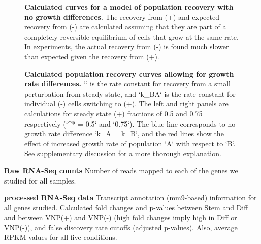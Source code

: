 \documentclass[aps,prl,twocolumn,superscriptaddress]{revtex4}
\begin{document}
\begin{figure}[H]
\begin{center}

\caption{\label{FIG:RecoveryCurveCalc} \textbf{Calculated curves for a model of population recovery with no growth differences}. The recovery from (+) and expected recovery from (-) are calculated assuming that they are part of a completely reversible equilibrium of cells that grow at the same rate. In experiments, the actual recovery from (-) is found much slower than expected given the recovery from (+).
}
\end{center}
\end{figure}


\begin{figure}[H]
\begin{center}

\caption{\label{FIG:GeneralCurves} \textbf{Calculated population recovery curves allowing for growth rate differences.} `\kappa` is the rate constant for recovery from a small perturbation from steady state, and `k_{BA}` is the rate constant for individual (-) cells switching to (+). The left and right panels are calculations for steady state (+) fractions of 0.5 and 0.75 respectively (`\alpha^* = 0.5` and `0.75`). The blue line corresponds to no growth rate difference `k_A = k_B`, and the red lines show the effect of increased growth rate of population `A` with respect to `B`. See supplementary discussion for a more thorough explanation. 
}
\end{center}
\end{figure}



\renewcommand{\thetable}{S\arabic{table}}

\begin{table}[H]
\begin{center}

\caption{\textbf{Raw RNA-Seq counts} Number of reads mapped to each of the genes we studied for all samples.
}
\end{center}
\end{table}


\begin{table}[H]
\begin{center}

\caption{\textbf{processed RNA-Seq data} Transcript annotation (mm9-based) information for all genes studied. Calculated fold changes and p-values between Stem and Diff and between VNP(+) and VNP(-) (high fold changes imply high in Diff or VNP(-)), and false discovery rate cutoffs (adjusted p-values). Also, average RPKM values for all five conditions.
}
\end{center}
\end{table}
\end{document}
